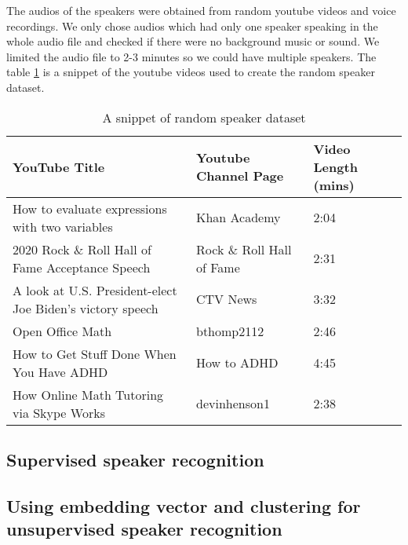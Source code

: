 \documentclass[10pt,twocolumn,letterpaper]{article}
\begin{document}
The audios of the speakers were obtained from random youtube videos and voice recordings. We only chose audios which had only one speaker speaking in the whole audio file and checked if there were no background music or sound. We limited the audio file to 2-3 minutes so we could have multiple speakers. The table \ref{tab:random-speaker-dataset} is a snippet of the youtube videos used to create the random speaker dataset.


\begin{table}[h]
    \begin{tabular}{|l|l|l|}
    \hline
    \textbf{YouTube Title}                                    & \textbf{Youtube Channel Page} & \textbf{Video Length (mins)} \\ \hline
    How to evaluate expressions with two variables            & Khan Academy                  & 2:04                         \\ \hline
    2020 Rock \& Roll Hall of Fame Acceptance Speech          & Rock \& Roll Hall of Fame     & 2:31                         \\ \hline
    A look at U.S. President-elect Joe Biden’s victory speech & CTV News                      & 3:32                         \\ \hline
    Open Office Math                                          & bthomp2112                    & 2:46                         \\ \hline
    How to Get Stuff Done When You Have ADHD                  & How to ADHD                   & 4:45                         \\ \hline
    How Online Math Tutoring via Skype Works                  & devinhenson1                  & 2:38                         \\ \hline
    \end{tabular}
    \caption{A snippet of random speaker dataset}
    \label{tab:random-speaker-dataset}
    \end{table}

\subsection{Supervised speaker recognition}


\subsection{Using embedding vector and clustering for unsupervised speaker recognition} 
\end{document}
